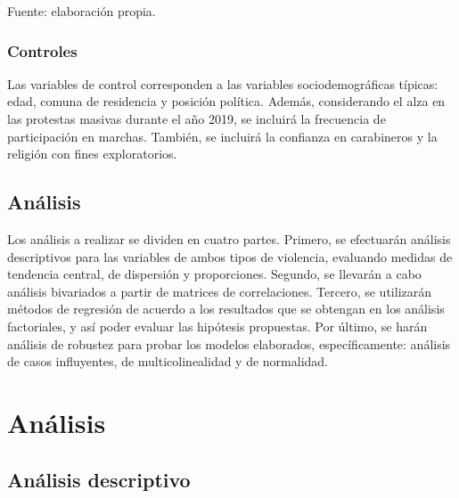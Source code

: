 \documentclass[12pt,twoside]{templates/facsothesis}
\begin{document}
\begin{center}
Fuente: elaboración propia.  
\end{center}

\hypertarget{controles}{%
\subsection{Controles}\label{controles}}

Las variables de control corresponden a las variables sociodemográficas típicas: edad, comuna de residencia y posición política. Además, considerando el alza en las protestas masivas durante el año 2019, se incluirá la frecuencia de participación en marchas. También, se incluirá la confianza en carabineros y la religión con fines exploratorios.

\hypertarget{anuxe1lisis}{%
\section{Análisis}\label{anuxe1lisis}}

Los análisis a realizar se dividen en cuatro partes. Primero, se efectuarán análisis descriptivos para las variables de ambos tipos de violencia, evaluando medidas de tendencia central, de dispersión y proporciones. Segundo, se llevarán a cabo análisis bivariados a partir de matrices de correlaciones. Tercero, se utilizarán métodos de regresión de acuerdo a los resultados que se obtengan en los análisis factoriales, y así poder evaluar las hipótesis propuestas. Por último, se harán análisis de robustez para probar los modelos elaborados, específicamente: análisis de casos influyentes, de multicolinealidad y de normalidad.

\pagebreak

\hypertarget{anuxe1lisis-1}{%
\chapter{Análisis}\label{anuxe1lisis-1}}

\hypertarget{anuxe1lisis-descriptivo}{%
\section{Análisis descriptivo}\label{anuxe1lisis-descriptivo}}
\end{document}
